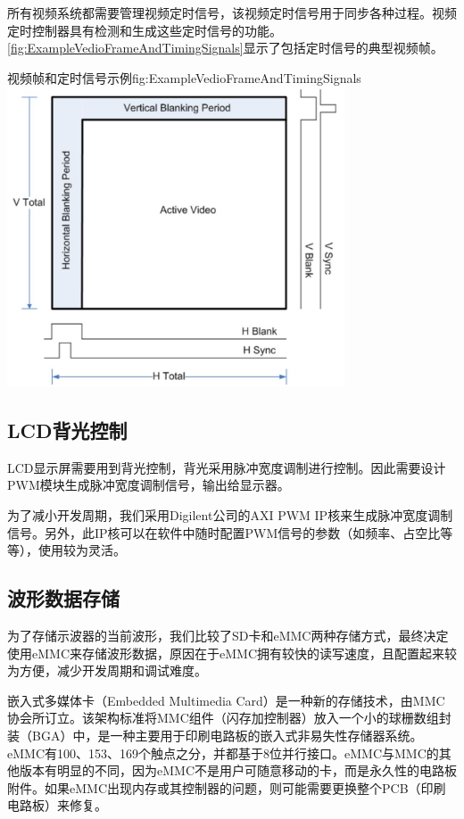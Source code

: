 \documentclass[supercite]{HustGraduPaper}
\begin{document}
	所有视频系统都需要管理视频定时信号，该视频定时信号用于同步各种过程。视频定时控制器具有检测和生成这些定时信号的功能。\autoref{fig:ExampleVedioFrameAndTimingSignals}显示了包括定时信号的典型视频帧。
	\begin{generalfig}[htb]{视频帧和定时信号示例}{fig:ExampleVedioFrameAndTimingSignals}
		\includegraphics[width=10cm]{Figures/ExampleVedioFrameAndTimingSignals.JPG}
	\end{generalfig}

	\subsection{LCD背光控制}
	LCD显示屏需要用到背光控制，背光采用脉冲宽度调制进行控制。因此需要设计PWM模块生成脉冲宽度调制信号，输出给显示器。
	
	为了减小开发周期，我们采用Digilent公司的AXI PWM IP核来生成脉冲宽度调制信号。另外，此IP核可以在软件中随时配置PWM信号的参数（如频率、占空比等等），使用较为灵活。
	\subsection{波形数据存储}
	为了存储示波器的当前波形，我们比较了SD卡和eMMC两种存储方式，最终决定使用eMMC来存储波形数据，原因在于eMMC拥有较快的读写速度，且配置起来较为方便，减少开发周期和调试难度。
	
	嵌入式多媒体卡（Embedded Multimedia Card）是一种新的存储技术，由MMC协会所订立。该架构标准将MMC组件（闪存加控制器）放入一个小的球栅数组封装（BGA）中，是一种主要用于印刷电路板的嵌入式非易失性存储器系统。eMMC有100、153、169个触点之分，并都基于8位并行接口。eMMC与MMC的其他版本有明显的不同，因为eMMC不是用户可随意移动的卡，而是永久性的电路板附件。如果eMMC出现内存或其控制器的问题，则可能需要更换整个PCB（印刷电路板）来修复。
	
\end{document}
